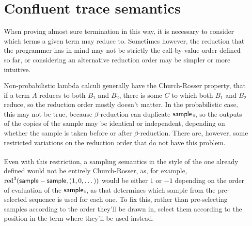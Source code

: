 \section{Confluent trace semantics}
\label{sec:confluent}

When proving almost sure termination in this way, it is necessary to consider which terms a given term may reduce to. Sometimes however, the reduction that the programmer has in mind may not be strictly the call-by-value order defined so far, or considering an alternative reduction order may be simpler or more intuitive.

Non-probabilistic lambda calculi generally have the Church-Rosser property, that if a term $A$ reduces to both $B_1$ and $B_2$, there is some $C$ 
to which both $B_1$ and $B_2$ reduce,
so the reduction order mostly doesn't matter. 
In the probabilistic case, this may not be true, because $\beta$-reduction can duplicate $\mathsf{sample}$s, so the outputs of the copies of the sample may be identical or independent, depending on whether the sample is taken before or after $\beta$-reduction. 
There are, however, some restricted variations on the reduction order that do not have this problem.

\paragraph{}
Even with this restriction, a sampling semantics in the style of the one already defined would not be entirely Church-Rosser, as, for example, $\operatorname{red}^3(\mathsf{sample} - \mathsf{sample}, (1,0,\dots))$ would be either $1$ or $-1$ depending on the order of evaluation of the $\mathsf{sample}$s, as that determines which sample from the pre-selected sequence is used for each one. To fix this, rather than pre-selecting samples according to the order they'll be drawn in, select them according to the position in the term where they'll be used instead.

